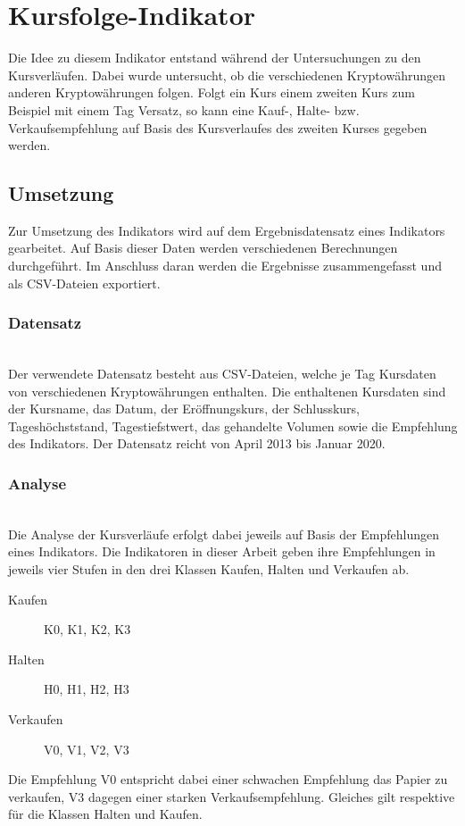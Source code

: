 

\section{Kursfolge-Indikator}
Die Idee zu diesem Indikator entstand während der Untersuchungen zu den Kursverläufen. Dabei wurde untersucht, ob die verschiedenen Kryptowährungen anderen Kryptowährungen folgen. Folgt ein Kurs einem zweiten Kurs zum Beispiel mit einem Tag Versatz, so kann eine Kauf-, Halte- bzw. Verkaufsempfehlung auf Basis des Kursverlaufes des zweiten Kurses gegeben werden.

\subsection{Umsetzung}
Zur Umsetzung des Indikators wird auf dem Ergebnisdatensatz eines Indikators gearbeitet. Auf Basis dieser Daten werden verschiedenen Berechnungen durchgeführt. Im Anschluss daran werden die Ergebnisse zusammengefasst und als CSV-Dateien exportiert. 

\subsubsection{Datensatz\nopunct}~\\
Der verwendete Datensatz besteht aus CSV-Dateien, welche je Tag Kursdaten von verschiedenen Kryptowährungen enthalten. Die enthaltenen Kursdaten sind der Kursname, das Datum, der Eröffnungskurs, der Schlusskurs, Tageshöchststand, Tagestiefstwert, das gehandelte Volumen sowie die Empfehlung des Indikators. Der Datensatz reicht von April 2013 bis Januar 2020.

\subsubsection{Analyse\nopunct}~\\
Die Analyse der Kursverläufe erfolgt dabei jeweils auf Basis der Empfehlungen eines Indikators. Die Indikatoren in dieser Arbeit geben ihre Empfehlungen in jeweils vier Stufen in den drei Klassen Kaufen, Halten und Verkaufen ab.
\begin{description}
\item[Kaufen] K0, K1, K2, K3
\item[Halten] H0, H1, H2, H3
\item[Verkaufen] V0, V1, V2, V3
\end{description}

Die Empfehlung V0 entspricht dabei einer schwachen Empfehlung das Papier zu verkaufen, V3 dagegen einer starken Verkaufsempfehlung. Gleiches gilt respektive für die Klassen Halten und Kaufen.


